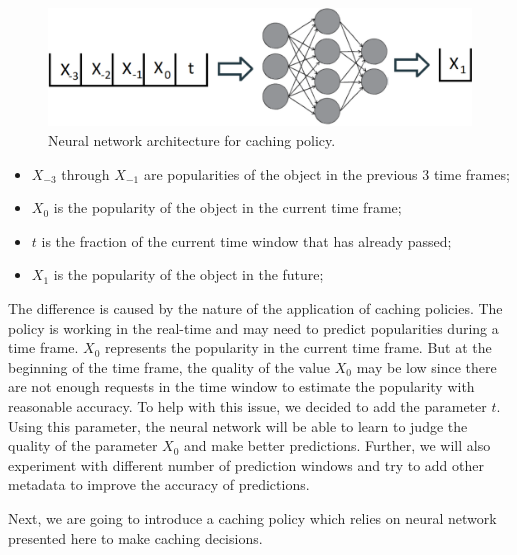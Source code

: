 \begin{figure}[h!]
	\centering
	\includegraphics[width=\linewidth]{pics/cache1.png}
	\caption{Neural network architecture for caching policy.}
	\label{fig:cache1}
\end{figure}

\begin{itemize}
	\item $X_{-3}$ through $X_{-1}$ are popularities of the object in the previous 3 time frames;
	\item $X_0$ is the popularity of the object in the current time frame;
	\item $t$ is the fraction of the current time window that has already passed;
	\item $X_1$ is the popularity of the object in the future;
\end{itemize}

The difference is caused by the nature of the application of caching policies. The policy is working in the real-time and may need to predict popularities during a time frame. $X_0$ represents the popularity in the current time frame. But at the beginning of the time frame, the quality of the value $X_0$ may be low since there are not enough requests in the time window to estimate the popularity with reasonable accuracy. To help with this issue, we decided to add the parameter $t$. Using this parameter, the neural network will be able to learn to judge the quality of the parameter $X_0$ and make better predictions. Further, we will also experiment with different number of prediction windows and try to add other metadata to improve the accuracy of predictions.

Next, we are going to introduce a caching policy which relies on neural network presented here to make caching decisions.

